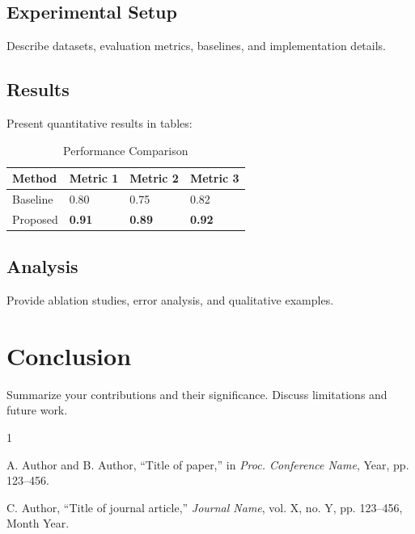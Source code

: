 \documentclass[10pt,conference]{IEEEtran}
\begin{document}
\subsection{Experimental Setup}

Describe datasets, evaluation metrics, baselines, and implementation details.

\subsection{Results}

Present quantitative results in tables:

\begin{table}[htbp]
\caption{Performance Comparison}
\label{tab:results}
\centering
\begin{tabular}{@{}llll@{}}
\toprule
Method & Metric 1 & Metric 2 & Metric 3 \\
\midrule
Baseline & 0.80 & 0.75 & 0.82 \\
Proposed & \textbf{0.91} & \textbf{0.89} & \textbf{0.92} \\
\bottomrule
\end{tabular}
\end{table}

\subsection{Analysis}

Provide ablation studies, error analysis, and qualitative examples.

\section{Conclusion}
\label{sec:conclusion}

Summarize your contributions and their significance. Discuss limitations and 
future work.



% 

\begin{thebibliography}{1}

A. Author and B. Author, ``Title of paper,'' in \emph{Proc. Conference Name}, 
Year, pp. 123--456.

C. Author, ``Title of journal article,'' \emph{Journal Name}, vol. X, no. Y, 
pp. 123--456, Month Year.

\end{thebibliography}
\end{document}
